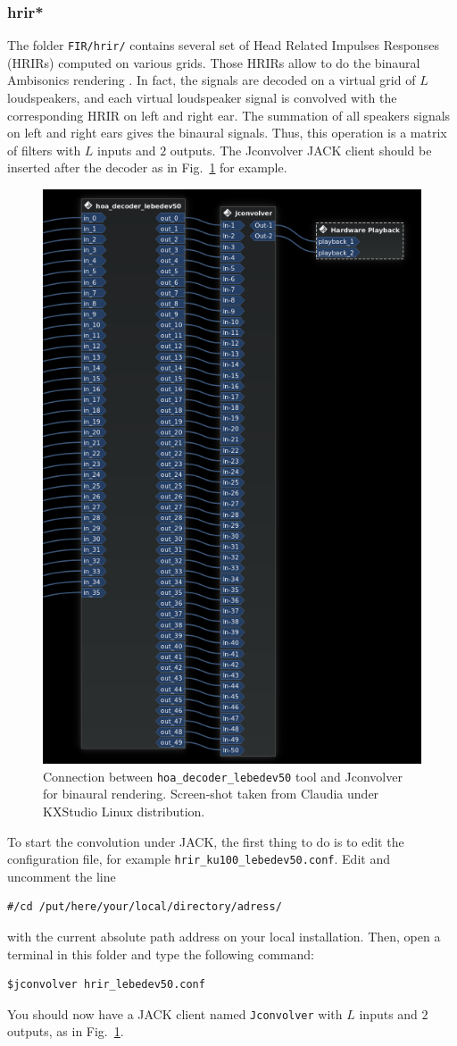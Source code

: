 \documentclass[10pt,a4paper]{article}
\begin{document}
\subsubsection{hrir*}
The folder \lstinline'FIR/hrir/' contains several set of Head Related Impulses Responses (HRIRs) computed on various grids. Those HRIRs allow to do the binaural Ambisonics rendering \cite{noisternig20033d}. In fact, the signals are decoded on a virtual grid of $L$ loudspeakers, and each virtual loudspeaker signal is convolved with the corresponding HRIR on left and right ear. The summation of all speakers signals on left and right ears gives the binaural signals. Thus, this operation is a matrix of filters with $L$ inputs and $2$ outputs. The Jconvolver JACK client should be inserted after the decoder as in Fig.~\ref{fig:jconvolver_hrir} for example.
\begin{figure}[!ht]
\centering
\includegraphics[width=0.65\columnwidth]{jconvolver_hrir.png}
\caption{Connection between \lstinline'hoa_decoder_lebedev50' tool and Jconvolver for binaural rendering. Screen-shot taken from Claudia under KXStudio Linux distribution.}
\label{fig:jconvolver_hrir}
\end{figure}
To start the convolution under JACK, the first thing to do is to edit the configuration file, for example \lstinline'hrir_ku100_lebedev50.conf'. Edit and uncomment the line 
\begin{lstlisting}
#/cd /put/here/your/local/directory/adress/
\end{lstlisting}
with the current absolute path address on your local installation.
Then, open a terminal in this folder and type the following command:
\begin{lstlisting}
$jconvolver hrir_lebedev50.conf
\end{lstlisting}
You should now have a JACK client named \lstinline'Jconvolver' with $L$ inputs and $2$ outputs, as in Fig.~\ref{fig:jconvolver_hrir}.
\end{document}

